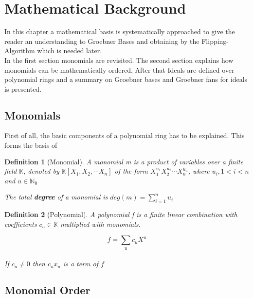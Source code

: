 \section{Mathematical Background}
\label{sec:background}

In this chapter a mathematical basis is systematically approached to give the reader an understanding to Groebner Bases and obtaining by the Flipping-Algorithm which is needed later.\\
In the first section monomials are revisited.
The second section explains how monomials can be mathematically ordered.
After that Ideals are defined over polynomial rings and a summary on Groebner bases and Groebner fans for ideals is presented.

\subsection{Monomials}
\label{subseb:Monomials}
\newtheorem{env_definition}{Definition}[section]

First of all, the basic components of a polynomial ring has to be explained. This forms the basis of

\begin{env_definition}[Monomial] 

A \emph{monomial m} is a product of variables over a finite field $\mathbb{K}$, denoted by $ \mathbb{K} \left[X_{1},X_{2},\cdots X_{n}\right]  $ of the form $X_{1}^{u_{1}}X_{2}^{u_{2}}\cdots X_{n}^{u_{n}}$, where $u_{i}, 1 < i < n $ and $u \in \mathbb{N}_{0} $

The total \textbf{degree} of a monomial is $deg(m) = \sum_{i=1}^n u_i $ 
\end{env_definition}

\begin{env_definition}[Polynomial]

A polynomial f is a finite linear combination with coefficients $c_{u} \in \mathbb{K}$ multiplied with monomials.

\[  f = \sum_{u} c_{u}X^{u}\]\\

If $c_{u}\neq0$ then $c_{u}x_{u}$ is a term of $f$


\end{env_definition}


\subsection{Monomial Order}
\label{subsec:Monomialorder}


